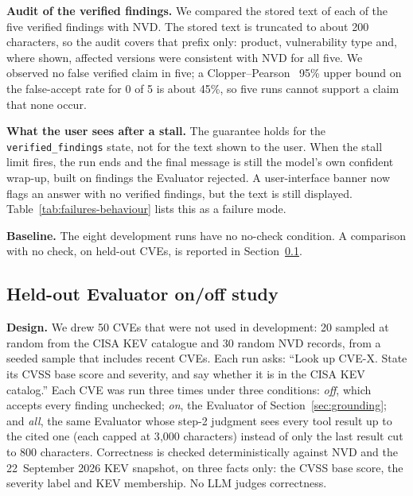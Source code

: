 \documentclass[conference]{IEEEtran}
\begin{document}
\textbf{Audit of the verified findings.} We compared the stored text of
each of the five verified findings with NVD. The stored text is truncated to
about 200 characters, so the audit covers that prefix only: product,
vulnerability type and, where shown, affected versions were consistent with
NVD for all five. We observed no false verified claim in five; a
Clopper--Pearson~\cite{clopper1934} 95\% upper bound on the false-accept rate for 0 of 5 is
about 45\%, so five runs cannot support a claim that none occur.

\textbf{What the user sees after a stall.} The guarantee holds for the
\texttt{verified\_findings} state, not for the text shown to the user. When
the stall limit fires, the run ends and the final message is still the
model's own confident wrap-up, built on findings the Evaluator rejected. A
user-interface banner now flags an answer with no verified findings, but
the text is still displayed. Table~\ref{tab:failures-behaviour} lists this
as a failure mode.

\textbf{Baseline.} The eight development runs have no no-check condition. A
comparison with no check, on held-out CVEs, is reported in
Section~\ref{sec:onoff}.

\subsection{Held-out Evaluator on/off study}
\label{sec:onoff}

\textbf{Design.} We drew 50 CVEs that were not used in development: 20 sampled at
random from the CISA KEV catalogue and 30 random NVD records, from a seeded
sample that includes recent CVEs. Each run asks: ``Look up CVE-X. State its CVSS
base score and severity, and say whether it is in the CISA KEV catalog.'' Each
CVE was run three times under three conditions: \emph{off}, which accepts every
finding unchecked; \emph{on}, the Evaluator of Section~\ref{sec:grounding}; and
\emph{all}, the same Evaluator whose step-2 judgment sees every tool result up to
the cited one (each capped at 3{,}000 characters) instead of only the last
result cut to 800 characters. Correctness is checked deterministically against
NVD and the 22~September 2026 KEV snapshot, on three facts only: the CVSS base
score, the severity label and KEV membership. No LLM judges correctness.
\end{document}
